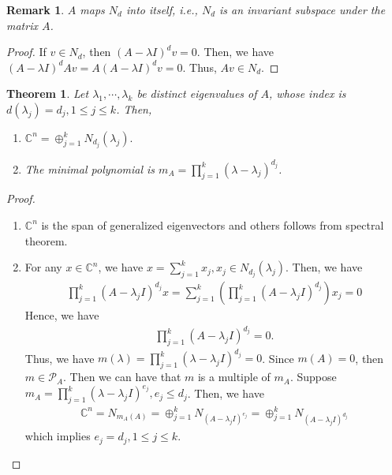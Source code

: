 \documentclass[11pt]{book}
\newtheorem{theorem}{Theorem}[section]
\newtheorem{remark}{Remark}[section]
\theoremstyle{definition}
\numberwithin{equation}{chapter}
\begin{document}
\medskip

\begin{remark}
$A$ maps $N_d$ into itself, i.e., $N_d$ is an invariant subspace under the matrix $A$.
\end{remark}
\begin{proof}
If $v\in N_d$, then $(A - \lambda I)^d v = 0$. Then, we have $(A - \lambda I)^d Av = A(A - \lambda I)^d v = 0$. Thus, $Av \in N_d$.
\end{proof}

\medskip

\begin{theorem}
Let $\lambda_1,\cdots,\lambda_k$ be distinct eigenvalues of $A$, whose index is $d\left(\lambda_j\right) = d_j, 1\leq j \leq k$. Then,
\begin{enumerate}[label=(\alph*)]
    \item $\mathbb{C}^n = \oplus^k_{j=1}N_{d_j}(\lambda_j).$
    \item The minimal polynomial is $m_A = \prod^k_{j=1}\left(\lambda - \lambda_j \right)^{d_j}$.
\end{enumerate}
\end{theorem}
\begin{proof}
~\begin{enumerate}[label=(\alph*)]
    \item $\mathbb{C}^n$ is the span of generalized eigenvectors and others follows from spectral theorem.
    \item For any $x\in\mathbb{C}^n$, we have $x = \sum^k_{j=1}x_j, x_j\in N_{d_j}(\lambda_j)$. Then, we have 
    \begin{align*}
        \prod^k_{j=1} \left(A - \lambda_j I\right)^{d_j}x = \sum^k_{j=1}\left(\prod^k_{j=1} \left(A - \lambda_j I\right)^{d_j} \right)x_j = 0
    \end{align*}
    Hence, we have 
    \begin{align*}
        \prod^k_{j=1} \left(A - \lambda_j I\right)^{d_j} = 0.
    \end{align*}
    Thus, we have $m(\lambda) = \prod^k_{j=1} \left(\lambda - \lambda_j I\right)^{d_j} = 0$. Since $m(A) = 0$, then $m\in \mathcal{P}_A$. Then we can have that $m$ is a multiple of $m_A$. Suppose $m_A = \prod^k_{j=1} \left(\lambda - \lambda_j I\right)^{e_j}, e_j\leq d_j$. Then, we have 
    \begin{align*}
        \mathbb{C}^n = N_{m_A(A)} = \oplus^k_{j=1}N_{(A-\lambda_j I)^{e_j}} = \oplus^k_{j=1}N_{(A-\lambda_j I)^{d_j}}
    \end{align*}
    which implies $e_j = d_j, 1\leq j \leq k$.
\end{enumerate}
\end{proof}
\end{document}
